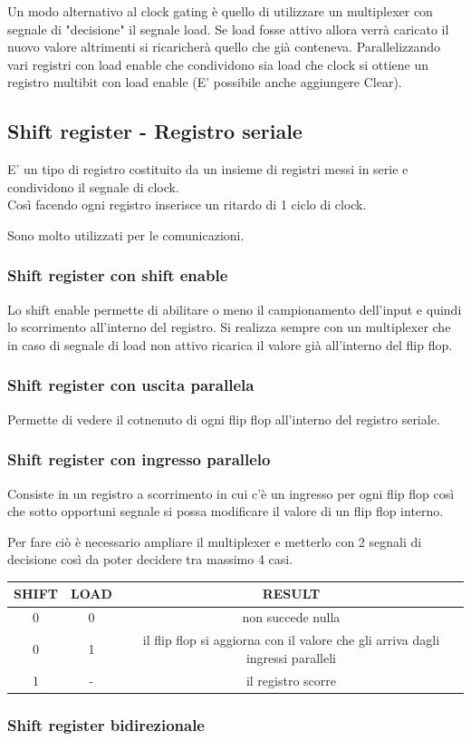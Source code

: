 \documentclass[a4paper]{book}
\begin{document}
Un modo alternativo al clock gating è quello di utilizzare un multiplexer con segnale di "decisione" il segnale load.
Se load fosse attivo allora verrà caricato il nuovo valore altrimenti si ricaricherà quello che già conteneva.
Parallelizzando vari registri con load enable che condividono sia load che clock si ottiene un registro multibit con load enable (E' possibile anche aggiungere Clear).

\subsection{Shift register - Registro seriale}

E' un tipo di registro costituito da un insieme di registri messi in serie e condividono il segnale di clock.
\\
Così facendo ogni registro inserisce un ritardo di 1 ciclo di clock.

Sono molto utilizzati per le comunicazioni.



\subsubsection*{Shift register con shift enable}

Lo shift enable permette di abilitare o meno il campionamento dell'input e quindi lo scorrimento all'interno del registro.
Si realizza sempre con un multiplexer che in caso di segnale di load non attivo ricarica il valore già all'interno del flip flop.

\subsubsection*{Shift register con uscita parallela}

Permette di vedere il cotnenuto di ogni flip flop all'interno del registro seriale.

\subsubsection*{Shift register con ingresso parallelo}

Consiste in un registro a scorrimento in cui c'è un ingresso per ogni flip flop così che sotto opportuni segnale si possa modificare il valore di un flip flop interno.

Per fare ciò è necessario ampliare il multiplexer e metterlo con 2 segnali di decisione così da poter decidere tra massimo 4 casi.\\
\begin{tabular}{|c|c|c|}
\hline
SHIFT & LOAD & RESULT \\
\hline
0 & 0 & non succede nulla \\
\hline
0 & 1 & il flip flop si aggiorna con il valore che gli arriva dagli ingressi paralleli \\
\hline
1 & - & il registro scorre \\
\hline
\end{tabular}

\subsubsection*{Shift register bidirezionale}
\end{document}
